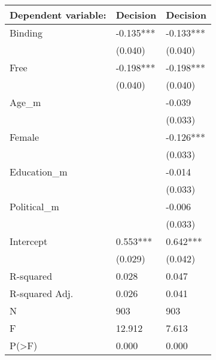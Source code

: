 \begin{tabular}{lll}
\toprule
Dependent variable: &   Decision &   Decision \\
\midrule
Binding        &  -0.135*** &  -0.133*** \\
               &    (0.040) &    (0.040) \\
Free           &  -0.198*** &  -0.198*** \\
               &    (0.040) &    (0.040) \\
Age\_m          &            &     -0.039 \\
               &            &    (0.033) \\
Female         &            &  -0.126*** \\
               &            &    (0.033) \\
Education\_m    &            &     -0.014 \\
               &            &    (0.033) \\
Political\_m    &            &     -0.006 \\
               &            &    (0.033) \\
Intercept      &   0.553*** &   0.642*** \\
               &    (0.029) &    (0.042) \\
R-squared      &      0.028 &      0.047 \\
R-squared Adj. &      0.026 &      0.041 \\
N              &        903 &        903 \\
F              &     12.912 &      7.613 \\
P(>F)          &      0.000 &      0.000 \\
\bottomrule
\end{tabular}
